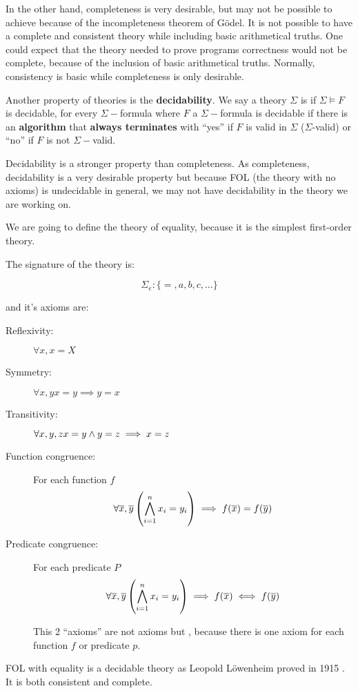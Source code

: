 \label{intr:consistency}
In the other hand, completeness is very desirable, but may not be possible to achieve because of the incompleteness theorem of Gödel.
%
It is not possible to have a complete and consistent theory while including basic arithmetical truths. 
%
One could expect that the theory needed to prove programs correctness would not be complete, because of the inclusion of basic arithmetical truths. 
%
Normally, consistency is basic while completeness is only desirable.

Another property of theories is the \textbf{decidability}. 
%
We say a theory $\Sigma$ is  if $\Sigma \vDash F$ is decidable, for every $\Sigma-$formula 
where 
$F$ a $\Sigma-$formula is decidable if there is an \textbf{algorithm} that \textbf{always terminates} with ``yes'' if $F$ is valid in $\Sigma$ ($\Sigma$-valid) or ``no'' if $F$ is not $\Sigma-$valid.


Decidability is a stronger property than completeness. 
%
As completeness, decidability is a very desirable property but because \gls{FOL} (the theory with no axioms) is undecidable in general, we may not have decidability in the theory we are working on.



\begin{example}

\label{theory:equality}

We are going to define the theory of equality, because it is the simplest first-order theory.

The signature of the theory is:

\[\Sigma_e:\{=,a,b,c,...\}\]

and it's axioms are:

\begin{description}
	\item[Reflexivity:	] $\forall x, x=X$
	\item[Symmetry:	] $\forall x,y x=y \implies y=x$
	\item[Transitivity:	] $\forall x,y,z x=y \wedge y=z \implies x=z$
	\item[Function congruence:] For each function $f$
	\[\forall \overline{x},\overline{y} \left( \bigwedge_{i=1}^n x_i = y_i \right) \implies f(\overline{x}) = f(\overline{y})\]
	\item[Predicate congruence:]  For each predicate $P$
	\[\forall \overline{x},\overline{y} \left( \bigwedge_{i=1}^n x_i = y_i \right) \implies f(\overline{x}) \iff f(\overline{y})\]

	This 2 ``axioms'' are not axioms but , because there is one axiom for each function $f$ or predicate $p$.
\end{description}

\gls{FOL} with equality is a decidable theory as Leopold Löwenheim proved in 1915 \cite{EqualityIsDecidable}. 
%
It is both consistent and complete.
\end{example}

